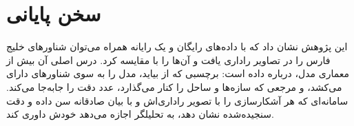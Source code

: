 \section{سخن پایانی}
این پژوهش نشان داد که با داده‌های رایگان و یک رایانه همراه می‌توان شناورهای خلیج فارس را در
تصاویر راداری یافت و آن‌ها را با  مقایسه کرد. درس اصلی آن بیش از معماری مدل، درباره
داده است: برچسبی که از  بیاید، مدل را به سوی شناورهای دارای  می‌کشد، و مرجعی
که سازه‌ها و ساحل را کنار می‌گذارد، عدد دقت را جابه‌جا می‌کند. سامانه‌ای که هر آشکارسازی را
با تصویر راداری‌اش و با بیان صادقانه سن داده و دقت سنجیده‌شده نشان دهد، به تحلیلگر اجازه
می‌دهد خودش داوری کند.
